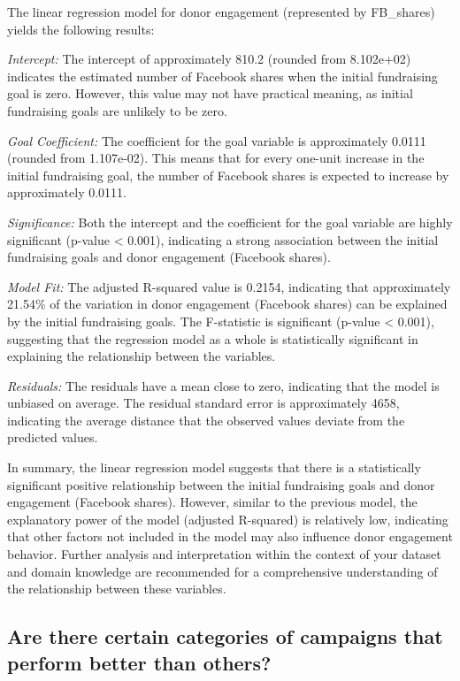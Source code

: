 \documentclass[
  letterpaper,
  DIV=11,
  numbers=noendperiod]{scrartcl}
\begin{document}
The linear regression model for donor engagement (represented by
FB\_shares) yields the following results:

\emph{Intercept:} The intercept of approximately 810.2 (rounded from
8.102e+02) indicates the estimated number of Facebook shares when the
initial fundraising goal is zero. However, this value may not have
practical meaning, as initial fundraising goals are unlikely to be zero.

\emph{Goal Coefficient:} The coefficient for the goal variable is
approximately 0.0111 (rounded from 1.107e-02). This means that for every
one-unit increase in the initial fundraising goal, the number of
Facebook shares is expected to increase by approximately 0.0111.

\emph{Significance:} Both the intercept and the coefficient for the goal
variable are highly significant (p-value \textless{} 0.001), indicating
a strong association between the initial fundraising goals and donor
engagement (Facebook shares).

\emph{Model Fit:} The adjusted R-squared value is 0.2154, indicating
that approximately 21.54\% of the variation in donor engagement
(Facebook shares) can be explained by the initial fundraising goals. The
F-statistic is significant (p-value \textless{} 0.001), suggesting that
the regression model as a whole is statistically significant in
explaining the relationship between the variables.

\emph{Residuals:} The residuals have a mean close to zero, indicating
that the model is unbiased on average. The residual standard error is
approximately 4658, indicating the average distance that the observed
values deviate from the predicted values.

In summary, the linear regression model suggests that there is a
statistically significant positive relationship between the initial
fundraising goals and donor engagement (Facebook shares). However,
similar to the previous model, the explanatory power of the model
(adjusted R-squared) is relatively low, indicating that other factors
not included in the model may also influence donor engagement behavior.
Further analysis and interpretation within the context of your dataset
and domain knowledge are recommended for a comprehensive understanding
of the relationship between these variables.

\hypertarget{are-there-certain-categories-of-campaigns-that-perform-better-than-others}{%
\subsection{Are there certain categories of campaigns that perform
better than
others?}\label{are-there-certain-categories-of-campaigns-that-perform-better-than-others}}
\end{document}

